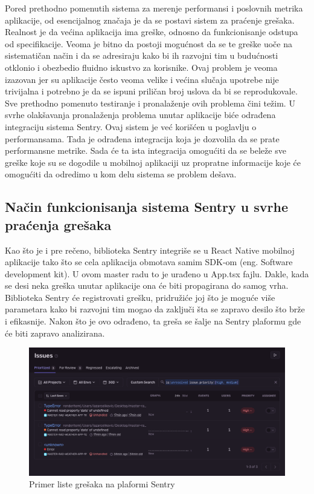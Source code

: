 \documentclass[12pt,oneside]{memoir}
\begin{document}
Pored prethodno pomenutih sistema za merenje performansi i poslovnih metrika aplikacije, od esencijalnog značaja je da se postavi sistem za praćenje grešaka. Realnost je da većina aplikacija ima greške, odnosno da funkcionisanje odstupa od specifikacije. Veoma je bitno da postoji mogućnost da se te greške uoče na sistematičan način i da se adresiraju kako bi ih razvojni tim u budućnosti otklonio i obezbedio fluidno iskustvo za korisnike. Ovaj problem je veoma izazovan jer su aplikacije često veoma velike i većina slučaja upotrebe nije trivijalna i potrebno je da se ispuni priličan broj uslova da bi se reprodukovale. Sve prethodno pomenuto testiranje i pronalaženje ovih problema čini težim. U svrhe olakšavanja pronalaženja problema unutar aplikacije biće odrađena integraciju sistema Sentry. Ovaj sistem je već korišćen u poglavlju o performansama. Tada je odrađena integracija koja je dozvolila da se prate performansne metrike. Sada će ta ista integracija omogućiti da se beleže sve greške koje su se dogodile u mobilnoj aplikaciji uz propratne informacije koje će omogućiti da odredimo u kom delu sistema se problem dešava.

\subsection{Način funkcionisanja sistema Sentry u svrhe praćenja grešaka}

Kao što je i pre rečeno, biblioteka Sentry integriše se u React Native mobilnoj aplikacije tako što se cela aplikacija obmotava samim SDK-om (eng. Software development kit). U ovom master radu to je urađeno u App.tsx fajlu. Dakle, kada se desi neka greška unutar aplikacije ona će biti propagirana do samog vrha. Biblioteka Sentry će registrovati grešku, pridružiće joj što je moguće više parametara kako bi razvojni tim mogao da zaključi šta se zapravo desilo što brže i efikasnije. Nakon što je ovo odrađeno, ta greša se šalje na Sentry plaformu gde će biti zapravo analizirana.

\begin{figure}[h!]
\centering
\includegraphics[scale=0.4]{docs/images/chapterSeven/sentryErrorLogs.png}
\caption{Primer liste grešaka na plaformi Sentry}
\label{fig:sentryErrorList}
\end{figure}
\end{document}
